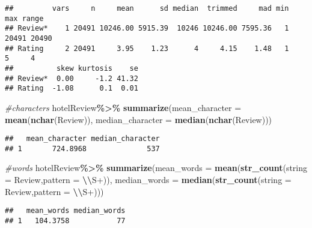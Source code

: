 \documentclass[
]{article}
\newenvironment{Shaded}{\begin{snugshade}}{\end{snugshade}}
\newcommand{\AttributeTok}[1]{\textcolor[rgb]{0.13,0.29,0.53}{#1}}
\newcommand{\CommentTok}[1]{\textcolor[rgb]{0.56,0.35,0.01}{\textit{#1}}}
\newcommand{\FunctionTok}[1]{\textcolor[rgb]{0.13,0.29,0.53}{\textbf{#1}}}
\newcommand{\NormalTok}[1]{#1}
\newcommand{\SpecialCharTok}[1]{\textcolor[rgb]{0.81,0.36,0.00}{\textbf{#1}}}
\newcommand{\StringTok}[1]{\textcolor[rgb]{0.31,0.60,0.02}{#1}}
\begin{document}
\begin{verbatim}
##         vars     n     mean      sd median  trimmed     mad min   max range
## Review*    1 20491 10246.00 5915.39  10246 10246.00 7595.36   1 20491 20490
## Rating     2 20491     3.95    1.23      4     4.15    1.48   1     5     4
##          skew kurtosis    se
## Review*  0.00     -1.2 41.32
## Rating  -1.08      0.1  0.01
\end{verbatim}

\begin{Shaded}
\begin{Highlighting}[]
\CommentTok{\#characters}
\NormalTok{hotelReview}\SpecialCharTok{\%\textgreater{}\%}
  \FunctionTok{summarize}\NormalTok{(}\AttributeTok{mean\_character =} \FunctionTok{mean}\NormalTok{(}\FunctionTok{nchar}\NormalTok{(Review)), }\AttributeTok{median\_character =} \FunctionTok{median}\NormalTok{(}\FunctionTok{nchar}\NormalTok{(Review)))}
\end{Highlighting}
\end{Shaded}

\begin{verbatim}
##   mean_character median_character
## 1       724.8968              537
\end{verbatim}

\begin{Shaded}
\begin{Highlighting}[]
\CommentTok{\#words}
\NormalTok{hotelReview}\SpecialCharTok{\%\textgreater{}\%}
  \FunctionTok{summarize}\NormalTok{(}\AttributeTok{mean\_words =} \FunctionTok{mean}\NormalTok{(}\FunctionTok{str\_count}\NormalTok{(}\AttributeTok{string =}\NormalTok{ Review,}\AttributeTok{pattern =} \StringTok{\textquotesingle{}}\SpecialCharTok{\textbackslash{}\textbackslash{}}\StringTok{S+\textquotesingle{}}\NormalTok{)), }\AttributeTok{median\_words =} \FunctionTok{median}\NormalTok{(}\FunctionTok{str\_count}\NormalTok{(}\AttributeTok{string =}\NormalTok{ Review,}\AttributeTok{pattern =} \StringTok{\textquotesingle{}}\SpecialCharTok{\textbackslash{}\textbackslash{}}\StringTok{S+\textquotesingle{}}\NormalTok{)))}
\end{Highlighting}
\end{Shaded}

\begin{verbatim}
##   mean_words median_words
## 1   104.3758           77
\end{verbatim}
\end{document}
